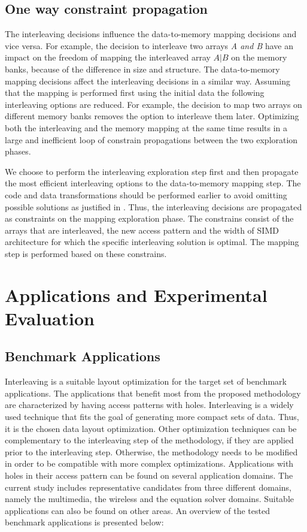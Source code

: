 \documentclass[prodmode,acmtecs]{acmsmall}
\begin{document}
\subsection{One way constraint propagation}

The interleaving decisions influence the data-to-memory mapping decisions and vice versa.
For example, the decision to interleave two arrays \textit{A and B} have an impact on the freedom of mapping the interleaved array $A\vert B$ on the memory banks, because of the difference in size and structure.
The data-to-memory mapping decisions affect the interleaving decisions in a similar way.
Assuming that the mapping is performed first using the initial data the following interleaving options are reduced.
For example, the decision to map two arrays on different memory banks removes the option to interleave them later.
Optimizing both the interleaving and the memory mapping at the same time results in a large and inefficient loop of constrain propagations between the two exploration phases.
 
We choose to perform the interleaving exploration step first and then propagate the most efficient interleaving options to the data-to-memory mapping step.
The code and data transformations should be performed earlier to avoid omitting possible solutions as justified in \cite{dtse}.
Thus, the interleaving decisions are propagated as constraints on the mapping exploration phase. 
The constrains consist of the arrays that are interleaved, the new access pattern and the width of SIMD architecture for which the specific interleaving solution is optimal.
The mapping step is performed based on these constrains.

\section{Applications and Experimental Evaluation}
\label{sec:applications}

\subsection{Benchmark Applications}

Interleaving is a suitable layout optimization for the target set of benchmark applications.
The applications that benefit most from the proposed methodology are characterized by having access patterns with holes.
Interleaving is a widely used technique that fits the goal of generating more compact sets of data.
Thus, it is the chosen data layout optimization.
Other optimization techniques can be complementary to the interleaving step of the methodology, if they are applied prior to the interleaving step.
Otherwise, the methodology needs to be modified in order to be compatible with more complex optimizations.
Applications with holes in their access pattern can be found on several application domains.
The current study includes representative candidates from three different domains, namely the multimedia, the wireless and the equation solver domains.
Suitable applications can also be found on other areas.
An overview of the tested benchmark applications is presented below:
\end{document}
